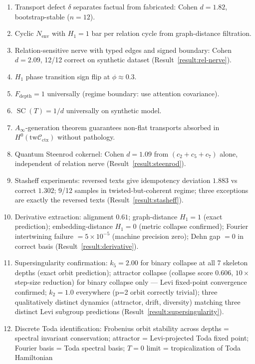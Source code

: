 \documentclass[11pt]{amsart}
\theoremstyle{definition}
\newcommand{\Cctx}{\mathcal{C}_{\!\mathrm{ctx}}}
\newcommand{\Nenv}{N_{\mathrm{env}}}
\DeclareMathOperator{\SC}{SC}
\newcommand{\twCtx}{\mathrm{tw}\Cctx}
\begin{document}
\begin{enumerate}
\item Transport defect $\delta$ separates factual from fabricated:
  Cohen $d = 1.82$, bootstrap-stable ($n=12$).
\item Cyclic $\Nenv$ with $H_1 = 1$ bar per relation cycle
  from graph-distance filtration.
\item Relation-sensitive nerve with typed edges and signed boundary:
  Cohen $d = 2.09$, 12/12 correct on synthetic dataset
  (Result~\ref{result:rel-nerve}).
\item $H_1$ phase transition sign flip at $\phi \approx 0.3$.
\item $F_\mathrm{depth} = 1$ universally (regime boundary: use attention covariance).
\item $\SC(T) = 1/d$ universally on synthetic model.
\item $A_\infty$-generation theorem guarantees non-flat transports absorbed
  in $H^0(\twCtx)$ without pathology.
\item Quantum Steenrod cokernel: Cohen $d = 1.09$ from $(c_2+c_5+c_7)$ alone,
  independent of relation nerve (Result~\ref{result:steenrod}).
\item Stasheff experiments: reversed texts give idempotency deviation $1.883$
  vs correct $1.302$; 9/12 samples in twisted-but-coherent regime;
  three exceptions are exactly the reversed texts (Result~\ref{result:stasheff}).
\item Derivative extraction: alignment $0.61$; graph-distance $H_1=1$ (exact
  prediction); embedding-distance $H_1=0$ (metric collapse confirmed);
  Fourier intertwining failure $= 5\times10^{-5}$ (machine precision zero);
  Dehn gap $= 0$ in correct basis (Result~\ref{result:derivative}).
\item Supersingularity confirmation: $k_5 = 2.00$ for binary collapse
  at all 7 skeleton depths (exact orbit prediction);
  attractor collapse (collapse score $0.606$, $10\times$ step-size reduction)
  for binary collapse only --- Levi fixed-point convergence confirmed;
  $k_2 = 1.0$ everywhere (p=2 orbit correctly trivial);
  three qualitatively distinct dynamics (attractor, drift, diversity)
  matching three distinct Levi subgroup predictions
  (Result~\ref{result:supersingularity}).
\item Discrete Toda identification: Frobenius orbit stability across depths
  = spectral invariant conservation; attractor = Levi-projected Toda fixed
  point; Fourier basis = Toda spectral basis;
  $T=0$ limit = tropicalization of Toda Hamiltonian

\end{enumerate}
\end{document}
